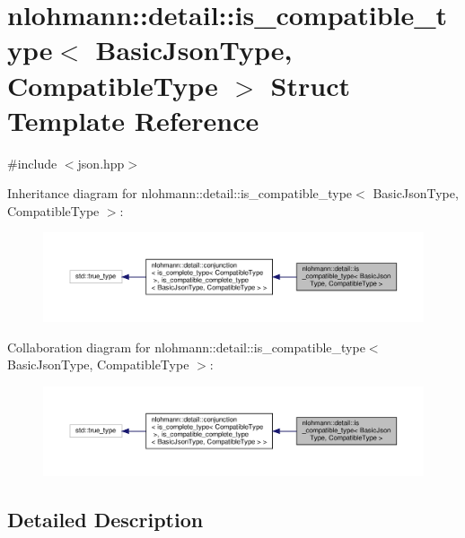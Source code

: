 \hypertarget{structnlohmann_1_1detail_1_1is__compatible__type}{}\section{nlohmann\+:\+:detail\+:\+:is\+\_\+compatible\+\_\+type$<$ Basic\+Json\+Type, Compatible\+Type $>$ Struct Template Reference}
\label{structnlohmann_1_1detail_1_1is__compatible__type}


{\ttfamily \#include $<$json.\+hpp$>$}



Inheritance diagram for nlohmann\+:\+:detail\+:\+:is\+\_\+compatible\+\_\+type$<$ Basic\+Json\+Type, Compatible\+Type $>$\+:
\nopagebreak
\begin{figure}[H]
\begin{center}
\leavevmode
\includegraphics[width=350pt]{structnlohmann_1_1detail_1_1is__compatible__type__inherit__graph}
\end{center}
\end{figure}


Collaboration diagram for nlohmann\+:\+:detail\+:\+:is\+\_\+compatible\+\_\+type$<$ Basic\+Json\+Type, Compatible\+Type $>$\+:
\nopagebreak
\begin{figure}[H]
\begin{center}
\leavevmode
\includegraphics[width=350pt]{structnlohmann_1_1detail_1_1is__compatible__type__coll__graph}
\end{center}
\end{figure}


\subsection{Detailed Description}
